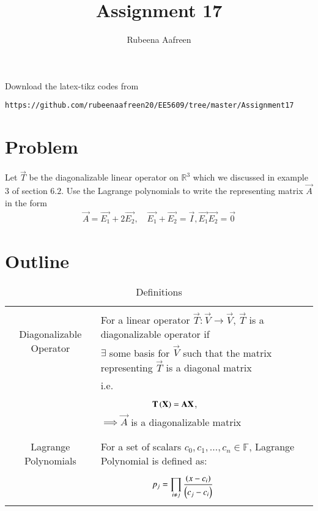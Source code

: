 \documentclass[journal,12pt]{IEEEtran}
\begin{document}
     \def\rightbox#1{\makebox[0in][r]{#1}}
     \def\centbox#1{\makebox[0in]{#1}}
     \def\topbox#1{\raisebox{-\baselineskip}[0in][0in]{#1}}
     \def\midbox#1{\raisebox{-0.5\baselineskip}[0in][0in]{#1}}
\vspace{3cm}
\title{Assignment 17}
\author{Rubeena Aafreen}
\maketitle
\bigskip
\renewcommand{\thefigure}{\theenumi}
\renewcommand{\thetable}{\theenumi}
%
Download the latex-tikz codes from 
%
\begin{lstlisting}
https://github.com/rubeenaafreen20/EE5609/tree/master/Assignment17
\end{lstlisting}
\section{\textbf{Problem}}
%
Let $\vec{T}$ be the diagonalizable linear operator on $\mathbb{R}^3$ which we discussed in example 3 of section $6.2$. Use the Lagrange polynomials to write the representing matrix $\vec{A}$ in the form
\begin{align}
    \vec{A}=\vec{E_1}+2\vec{E_2},\quad \vec{E_1}+\vec{E_2}=\vec{I}, \vec{E_1}\vec{E_2}=\vec{0}
\end{align}
\section{\textbf{Outline}}
\renewcommand{\thetable}{1}
\begin{table}[ht!]
\centering
\begin{tabular}{|c|l|}
    \hline
    \multirow{3}{*}{Diagonalizable Operator} 
	& \\
	& For a linear operator $\vec{T}\colon \vec{V}\longrightarrow \vec{V}$, $\vec{T}$ is a diagonalizable operator if \\
	& $\exists$ some basis for $\Vec{V}$ such that the matrix representing $\vec{T}$ is a diagonal matrix\\
	&i.e.\\
	& $\qquad\qquad\qquad \vec{T}\brak{\vec{X}}=\Vec{A}\Vec{X}$,\\
    &$\implies \vec{A}$ is a diagonalizable matrix\\
	&\\
	\hline
	\multirow{3}{*}{Lagrange Polynomials} 
	& \\
	& For a set of scalars $c_0, c_1,\dots, c_n \in \mathbb{F}$, Lagrange Polynomial is defined as:\\
	&\\
	&$\qquad\qquad\qquad p_j=\displaystyle\prod_{i\neq j}\frac{\left(x-c_i\right)}{\left(c_j-c_i\right)}$\\
	&\\
	\hline
\end{tabular}
\label{table:1}
    \caption{Definitions}
\end{table}
\newpage
\end{document}
